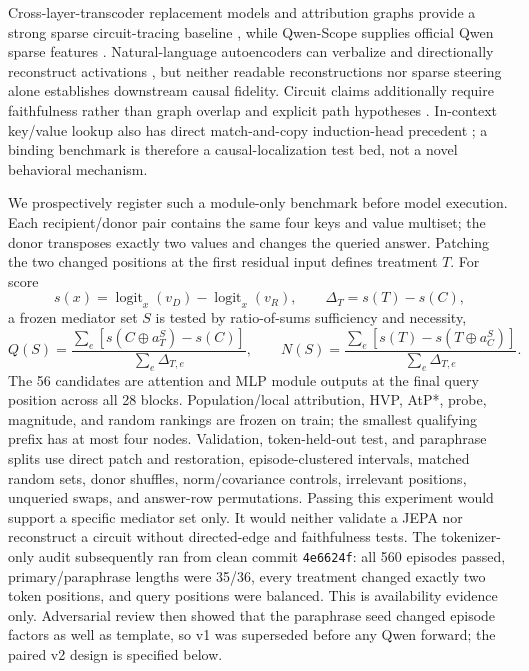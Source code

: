 \documentclass[10pt]{article}
\newcommand{\code}[1]{\texttt{#1}}
\begin{document}
Cross-layer-transcoder replacement models and attribution graphs provide a
strong sparse circuit-tracing baseline \cite{ameisen2025circuittracing}, while
Qwen-Scope supplies official Qwen sparse features \cite{deng2026qwenscope}.
Natural-language autoencoders can verbalize and directionally reconstruct
activations \cite{frasertaliente2026nla}, but neither readable reconstructions
nor sparse steering alone establishes downstream causal fidelity.
Circuit claims additionally require faithfulness rather than graph overlap
\cite{hanna2024faithfulness} and explicit path hypotheses
\cite{goldowskydill2023pathpatching}.  In-context key/value lookup also has
direct match-and-copy induction-head precedent
\cite{olsson2022induction,singh2024induction}; a binding benchmark is therefore
a causal-localization test bed, not a novel behavioral mechanism.

We prospectively register such a module-only benchmark before model execution.
Each recipient/donor pair contains the same four keys and value multiset; the
donor transposes exactly two values and changes the queried answer.  Patching
the two changed positions at the first residual input defines treatment $T$.
For score
\[
  s(x)=\operatorname{logit}_{x}(v_D)-\operatorname{logit}_{x}(v_R),
  \qquad \Delta_T=s(T)-s(C),
\]
a frozen mediator set $S$ is tested by ratio-of-sums sufficiency and necessity,
\[
 Q(S)=\frac{\sum_e[s(C\oplus a^S_T)-s(C)]}{\sum_e\Delta_{T,e}},
 \qquad
 N(S)=\frac{\sum_e[s(T)-s(T\oplus a^S_C)]}{\sum_e\Delta_{T,e}}.
\]
The 56 candidates are attention and MLP module outputs at the final query
position across all 28 blocks.  Population/local attribution, HVP, AtP*, probe,
magnitude, and random rankings are frozen on train; the smallest qualifying
prefix has at most four nodes.  Validation, token-held-out test, and paraphrase
splits use direct patch and restoration, episode-clustered intervals, matched
random sets, donor shuffles, norm/covariance controls, irrelevant positions,
unqueried swaps, and answer-row permutations.  Passing this experiment would
support a specific mediator set only.  It would neither validate a JEPA nor
reconstruct a circuit without directed-edge and faithfulness tests.
The tokenizer-only audit subsequently ran from clean commit \code{4e6624f}:
all 560 episodes passed, primary/paraphrase lengths were 35/36, every treatment
changed exactly two token positions, and query positions were balanced.  This
is availability evidence only.  Adversarial review then showed that the
paraphrase seed changed episode factors as well as template, so v1 was
superseded before any Qwen forward; the paired v2 design is specified below.
\end{document}
